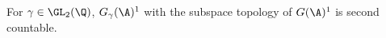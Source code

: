 For $\gamma\in\GL_2(\Q)$, $G_\gamma(\A)^1$ with the subspace topology of $G(\A)^1$ is second countable.
